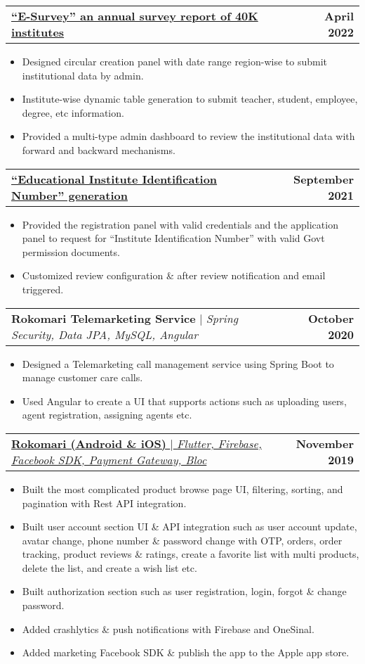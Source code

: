 \documentclass[letterpaper,11pt]{article}
\makeatletter
\newcommand{\resumeItem}[1]{
  \item\small{
    {#1 \vspace{-2pt}}
  }
}
\newcommand{\resumeProjectHeading}[2]{
    \item
    \begin{tabular*}{1.001\textwidth}{l@{\extracolsep{\fill}}r}
      \small#1 & \textbf{\small #2}\\
    \end{tabular*}\vspace{-7pt}
}
\newcommand{\resumeItemListStart}{\begin{itemize}}
\newcommand{\resumeItemListEnd}{\end{itemize}\vspace{-5pt}}
\makeatother
\begin{document}
          \resumeProjectHeading
          {\href{https://drive.google.com/file/d/1T99QKmyLxcL_5ZhCJD0mjvOavD9YCTEh/preview}{\textbf{“E-Survey” an annual survey report of 40K institutes}}}{April 2022}
          \resumeItemListStart
            \resumeItem{Designed circular creation panel with date range region-wise to submit institutional data by admin.}
            \resumeItem{Institute-wise dynamic table generation to submit teacher, student, employee, degree, etc information.}
            \resumeItem{Provided a multi-type admin dashboard to review the institutional data with forward and backward mechanisms.}
          \resumeItemListEnd 
           \vspace{-13pt}

          \resumeProjectHeading
          {\href{https://drive.google.com/file/d/1vD1i5SNvjEfylsUq-Ny00h5hgWqQo8LT/preview}{\textbf{“Educational Institute Identification Number” generation}}}{September 2021}
          \resumeItemListStart
            \resumeItem{Provided the registration panel with valid credentials and the application panel to request for “Institute Identification Number” with valid Govt permission documents.}
            \resumeItem{Customized review configuration \& after review notification and email triggered.}
          \resumeItemListEnd 
           \vspace{-13pt}

          \resumeProjectHeading
          {\textbf{Rokomari Telemarketing Service} $|$ \emph{Spring Security, Data JPA, MySQL, Angular}}{October 2020}
          \resumeItemListStart
            \resumeItem{Designed a Telemarketing call management service using Spring Boot to manage customer care calls.}
            \resumeItem{Used Angular to create a UI that supports actions such as uploading users, agent registration, assigning agents etc.}
          \resumeItemListEnd 
           \vspace{-13pt}

           \resumeProjectHeading
          {\href{https://apps.apple.com/us/app/rokomari-trusted-online-store/id1493045502}{\textbf{Rokomari (Android \& iOS)} $|$ \emph{Flutter, Firebase, Facebook SDK, Payment Gateway, Bloc}}}{November 2019}
          \resumeItemListStart
            \resumeItem{Built the most complicated product browse page UI, filtering, sorting, and pagination with Rest API integration.}
            \resumeItem{Built user account section UI \& API integration such as user account update, avatar change, phone number \& password change with OTP, orders, order tracking, product reviews \& ratings, create a favorite list with multi products, delete the list, and create a wish list etc.}
            \resumeItem{Built authorization section such as user registration, login, forgot \& change password.}
            \resumeItem{Added crashlytics \& push notifications with Firebase and OneSinal.}
            \resumeItem{Added marketing Facebook SDK \& publish the app to the Apple app store.}
          \resumeItemListEnd 
           \vspace{-13pt}
        
\end{document}
